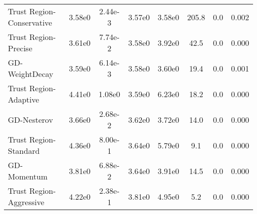 \documentclass{article}
\begin{document}
\begin{table}[htbp]
{\begin{tabular}{p{2.5cm}*{7}{c}}
Trust Region-Conservative & 3.58e0 & 2.44e-3 & 3.57e0 & 3.58e0 & 205.8 & 0.0 & 0.002 \\
Trust Region-Precise & 3.61e0 & 7.74e-2 & 3.58e0 & 3.92e0 & 42.5 & 0.0 & 0.000 \\
GD-WeightDecay & 3.59e0 & 6.14e-3 & 3.58e0 & 3.60e0 & 19.4 & 0.0 & 0.001 \\
Trust Region-Adaptive & 4.41e0 & 1.08e0 & 3.59e0 & 6.23e0 & 18.2 & 0.0 & 0.000 \\
GD-Nesterov & 3.66e0 & 2.68e-2 & 3.62e0 & 3.72e0 & 14.0 & 0.0 & 0.000 \\
Trust Region-Standard & 4.36e0 & 8.00e-1 & 3.64e0 & 5.79e0 & 9.1 & 0.0 & 0.000 \\
GD-Momentum & 3.81e0 & 6.88e-2 & 3.64e0 & 3.91e0 & 14.5 & 0.0 & 0.000 \\
Trust Region-Aggressive & 4.22e0 & 2.38e-1 & 3.81e0 & 4.95e0 & 5.2 & 0.0 & 0.000 \\
\bottomrule
\end{tabular}
}
\end{table}
\end{document}
